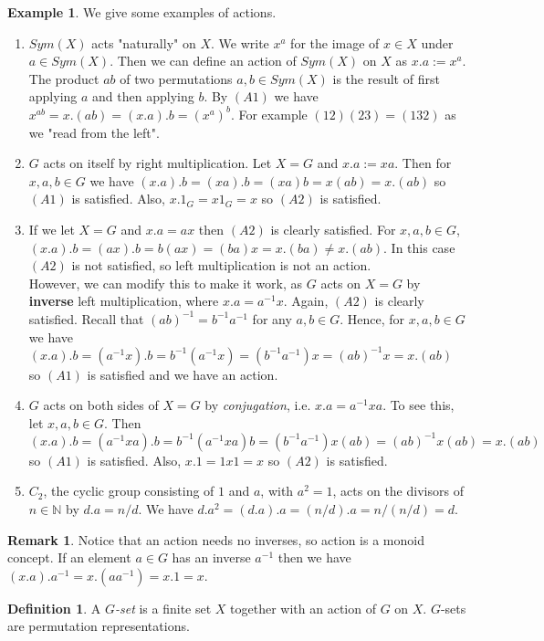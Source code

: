 \documentclass[12pt]{amsart}
\theoremstyle{definition}
\newtheorem{example}[theorem]{Example}
\newtheorem{definition}[theorem]{Definition}
\newtheorem{remark}[theorem]{Remark}
\begin{document}
\begin{example}
We give some examples of actions.
\begin{enumerate}
\item $Sym(X)$ acts "naturally" on $X$.  We write $x^a$ for the image of $x\in X$ under $a\in Sym(X)$.  Then we can define an action of $Sym(X)$ on $X$ as $x.a:=x^a$.  The product $ab$ of two permutations $a, b\in Sym(X)$ is the result of first applying $a$ and then applying $b$.  By $(A1)$ we have $x^{ab}=x.(ab)=(x.a).b=(x^a)^b$.  For example $(12)(23)=(132)$ as we "read from the left".
\item $G$ acts on itself by right multiplication.  Let $X=G$ and $x.a:=xa$.  Then for $x, a, b\in G$ we have $(x.a).b=(xa).b=(xa)b=x(ab)=x.(ab)$ so $(A1)$ is satisfied.  Also, $x.1_G=x1_G=x$ so $(A2)$ is satisfied.
\item If we let $X=G$ and $x.a=ax$ then $(A2)$ is clearly satisfied.  For $x, a, b\in G$, $(x.a).b=(ax).b=b(ax)=(ba)x=x.(ba)\neq x.(ab)$.  In this case $(A2)$ is not satisfied, so left multiplication is not an action.\\
    However, we can modify this to make it work, as $G$ acts on $X=G$ by \textbf{inverse} left multiplication, where $x.a=a^{-1}x$.  Again, $(A2)$ is clearly satisfied.  Recall that $(ab)^{-1}=b^{-1}a^{-1}$ for any $a, b\in G$.  Hence, for $x, a, b\in G$ we have $(x.a).b=(a^{-1}x).b=b^{-1}(a^{-1}x)=(b^{-1}a^{-1})x=(ab)^{-1}x=x.(ab)$ so $(A1)$ is satisfied and we have an action.
\item $G$ acts on both sides of $X=G$ by \emph{conjugation}, i.e. $x.a=a^{-1}xa$.  To see this, let $x, a, b\in G$.  Then $(x.a).b=(a^{-1}xa).b=b^{-1}(a^{-1}xa)b=(b^{-1}a^{-1})x(ab)=(ab)^{-1}x(ab)=x.(ab)$ so $(A1)$ is satisfied.  Also, $x.1=1x1=x$ so $(A2)$ is satisfied.
\item $C_2$, the cyclic group consisting of $1$ and $a$, with $a^2=1$, acts on the divisors of $n\in\mathbb{N}$ by $d.a=n/d$.  We have $d.a^2=(d.a).a=(n/d).a=n/(n/d)=d$.
\end{enumerate}
\end{example}

\begin{remark}
Notice that an action needs no inverses, so action is a monoid concept.  If an element $a\in G$ has an inverse $a^{-1}$ then we have $(x.a).a^{-1}=x.(aa^{-1})=x.1=x$.
\end{remark}

\begin{definition}
A \emph{$G$-set} is a finite set $X$ together with an action of $G$ on $X$.  $G$-sets are permutation representations.
\end{definition}
\end{document}

